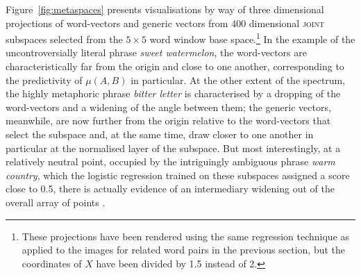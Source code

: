 Figure~\ref{fig:metaspaces} presents visualisations by way of three dimensional projections of word-vectors and generic vectors from 400 dimensional \textsc{joint} subspaces selected from the $5 \times 5$ word window base space.\footnote{These projections have been rendered using the same regression technique as applied to the images for related word pairs in the previous section, but the coordinates of $X$ have been divided by 1.5 instead of 2.}    In the example of the uncontroversially literal phrase \emph{sweet watermelon}, the word-vectors are characteristically far from the origin and close to one another, corresponding to the predictivity of $\mu(A,B)$ in particular.  At the other extent of the spectrum, the highly metaphoric phrase \emph{bitter letter} is characterised by a dropping of the word-vectors and a widening of the angle between them; the generic vectors, meanwhile, are now further from the origin relative to the word-vectors that select the subspace and, at the same time, draw closer to one another in particular at the normalised layer of the subspace.  But most interestingly, at a relatively neutral point, occupied by the intriguingly ambiguous phrase \emph{warm country}, which the logistic regression trained on these subspaces assigned a score close to 0.5, there is actually evidence of an intermediary widening out of the overall array of points  .

